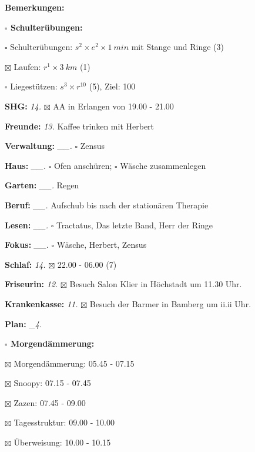 \documentclass[10pt,a4paper]{article}
\newcommand\prop[1] {{\color {alizarin} {\bf #1}}}        %
\newcommand\opti[1] {{\color {amethyst} {\bf #1}}}        %
\newcommand\mand[1] {{\color {burntorange} {\bf #1}}}     %
\newcommand\topspace{\vskip -15pt \hskip 20pt}
\newcommand\bottomspace{\vskip 4pt}
\newcommand\n[1] { {\sl #1.} \hskip 5pt }
\begin{document}
\begin{mdframed}[style=daystyle]
\begin{labeling}{{\mand {Bemerkungen:}}}
\begin{minipage}{0.75\textwidth}
\begin{labeling}{\prop {$\square$ {Schulterübungen:}}}
      \item[$\square$ Schulterübungen:] $s^2 \times e^2 \times 1\ min$ mit Stange und Ringe (3)
      \item[$\boxtimes$ Laufen:]          $r^1 \times 3\ km$ (1)
      \item[$\square$ Liegestützen:]    $s^3 \times r^{10}$ (5), Ziel: 100
      \end{labeling}
    \end{minipage}
    \bottomspace        
  \item[{\mand {SHG:}}]            \n{14} $\boxtimes$ AA in Erlangen von 19.00 - 21.00
  \item[{\mand {Freunde:}}]        \n{13} Kaffee trinken mit Herbert
  \item[{\mand {Verwaltung:}}]   \n{\_\_} $\square$ Zensus
  \item[{\mand {Haus:}}]         \n{\_\_} $\square$ Ofen anschüren; $\square$ Wäsche zusammenlegen
  \item[{\mand {Garten:}}]       \n{\_\_} Regen
  \item[{\mand {Beruf:}}]        \n{\_\_} Aufschub bis nach der stationären Therapie
  \item[{\mand {Lesen:}}]        \n{\_\_} $\square$ Tractatus, Das letzte Band, Herr der Ringe
  \item[{\mand {Fokus:}}]        \n{\_\_} $\square$ Wäsche, Herbert, Zensus
  \item[{\mand {Schlaf:}}]         \n{14} $\boxtimes$ 22.00 - 06.00 (7)
  \item[{\opti {Friseurin:}}]      \n{12} $\boxtimes$ Besuch Salon Klier in Höchstadt um 11.30 Uhr.
  \item[{\opti {Krankenkasse:}}]   \n{11} $\boxtimes$ Besuch der Barmer in Bamberg um ii.ii Uhr.
  \item[{\mand {Plan:}}]          \n{\_4}
    \topspace
    \begin{minipage}{0.75\textwidth}  
      \begin{labeling}{\prop {$\square$ {Morgendämmerung:}}} 
        \setlength\itemsep{-3pt}
      \item[$\boxtimes$ Morgendämmerung:] 05.45 - 07.15
      \item[$\boxtimes$ Snoopy:]          07.15 - 07.45
      \item[$\boxtimes$ Zazen:]           07.45 - 09.00
      \item[$\boxtimes$ Tagesstruktur:]   09.00 - 10.00
      \item[$\boxtimes$ Überweisung:]     10.00 - 10.15

\end{labeling}
\end{minipage}
\end{labeling}
\end{mdframed}
\end{document}
